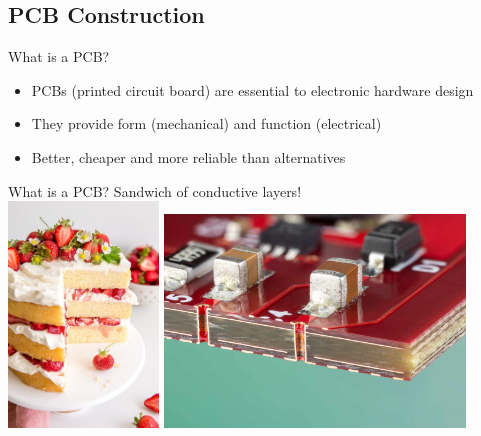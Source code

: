 \documentclass{beamer}
\begin{document}
\subsection{PCB Construction}

\begin{frame}{What is a PCB?}
  \begin{itemize}
    \item PCBs (printed circuit board) are essential to electronic hardware design
    \item They provide form (mechanical) and function (electrical)
    \item Better, cheaper and more reliable than alternatives
  \end{itemize}
\end{frame}

\begin{frame}{What is a PCB?}
  \centering
  Sandwich of conductive layers!\\
  \includegraphics[width=0.3\textwidth]{images/cake-cross-section.png}
  \includegraphics[width=0.6\textwidth]{images/pcb-cross-section.png}
\end{frame}
\end{document}
